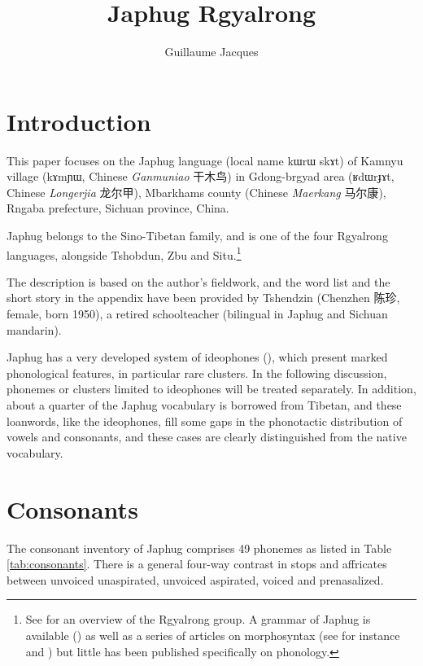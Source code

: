 \documentclass[oldfontcommands,oneside,a4paper,11pt]{article}
\newcommand{\ipa}[1]{{\phon #1}} %
\newcommand{\zh}[1]{{\cn #1}}
\begin{document}
 

\title{Japhug Rgyalrong}
\author{Guillaume Jacques}
\maketitle
\linenumbers
 \section{Introduction}
 This paper focuses on the Japhug language (local name \ipa{kɯrɯ skɤt}) of Kamnyu village (\ipa{kɤmɲɯ}, Chinese \textit{Ganmuniao} \zh{干木鸟}) in Gdong-brgyad area (\ipa{ʁdɯrɟɤt}, Chinese  \textit{Longerjia} \zh{龙尔甲}), Mbarkhams county (Chinese \textit{Maerkang} \zh{马尔康}), Rngaba prefecture, Sichuan province, China.
 
 Japhug belongs to the Sino-Tibetan family, and is one of the four Rgyalrong languages, alongside Tshobdun, Zbu and Situ.\footnote{See  \citet{jackson00sidaba} for an overview of the Rgyalrong group. A grammar of Japhug is available (\citealt{jacques08}) as well as a series of articles on morphosyntax (see for instance  \citealt{jacques13harmonization} and
 \citealt{jacques14antipassive}) but little has been published specifically on phonology. } 
 
The description is based on the author’s fieldwork, and the word list and the short story in the appendix have been provided by Tshendzin (Chenzhen \zh{陈珍}, female, born 1950), a retired schoolteacher (bilingual in Japhug and Sichuan mandarin).

 Japhug has a very developed system of ideophones (\citealt{japhug14ideophones}), which present marked phonological features, in particular rare clusters. In the following discussion, phonemes or clusters limited to ideophones will be treated separately. In addition, about a quarter of the Japhug vocabulary is borrowed from Tibetan, and these loanwords, like the ideophones, fill some gaps in the phonotactic distribution of vowels and consonants, and these cases are clearly distinguished from the native vocabulary.

 
 \section{Consonants}
 The consonant inventory of Japhug comprises 49 phonemes as listed in Table \ref{tab:consonants}. There is a general four-way contrast in stops and affricates between unvoiced unaspirated, unvoiced aspirated, voiced and prenasalized.
 
\end{document}
